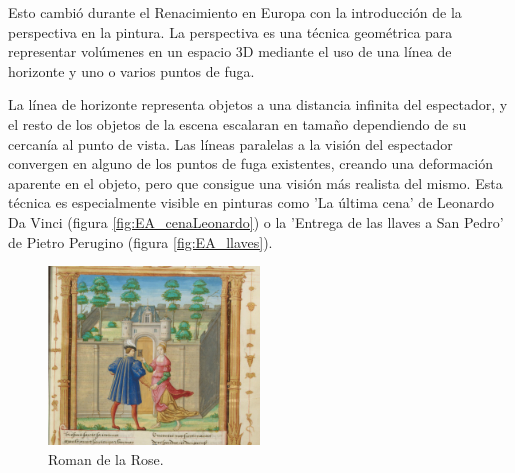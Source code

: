 Esto cambió durante el Renacimiento en Europa con la introducción de la perspectiva en la pintura. La perspectiva es una técnica geométrica para representar volúmenes en un espacio 3D mediante el uso de una línea de horizonte y uno o varios puntos de fuga.

La línea de horizonte representa objetos a una distancia infinita del espectador, y el resto de los objetos de la escena escalaran en tamaño dependiendo de su cercanía al punto de vista. Las líneas paralelas a la visión del espectador convergen en alguno de los puntos de fuga existentes, creando una deformación aparente en el objeto, pero que consigue una visión más realista del mismo. Esta técnica es especialmente visible en pinturas como 'La última cena' de Leonardo Da Vinci (figura \ref{fig:EA_cenaLeonardo}) o la 'Entrega de las llaves a San Pedro' de Pietro Perugino (figura \ref{fig:EA_llaves}).



\begin{figure}
  \centering
\includegraphics[width=0.5\textwidth]{03.EstudioProblema/01.EstadoArte/00.Figuras/09.renacimiento_roman_rose.jpg}
    \caption{Roman de la Rose. \cite{EA_img_roman}}
    \label{fig:EA_roman}
\end{figure}


